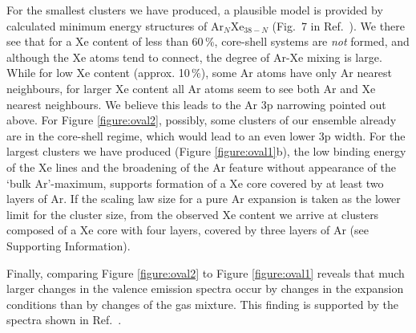 For the smallest clusters we have produced, a plausible model is provided by calculated minimum energy structures of Ar$_N$Xe$_{38-N}$ (Fig.\ 7 in Ref.\ \cite{marques}).
We there see that for a Xe content of less than 60\,\%, core-shell systems are {\it not} formed, and although the Xe atoms tend to connect, the degree of Ar-Xe mixing is large.
While for low Xe content (approx. 10\,\%), some Ar atoms have only Ar nearest neighbours, for larger Xe content all Ar atoms seem to see both Ar and Xe nearest neighbours.
We believe this leads to the Ar 3p narrowing pointed out above.
For Figure \ref{figure:oval2}, possibly, some clusters of our ensemble already are in the core-shell regime, which would lead to an even lower 3p width.
For the largest clusters we have produced (Figure \ref{figure:oval1}b), the low binding energy of the Xe lines and the broadening of the Ar feature without appearance of the `bulk Ar'-maximum, supports formation of a Xe core covered by at least two layers of Ar.
If the scaling law size for a pure Ar expansion is taken as the lower limit for the cluster size, from the observed Xe content we arrive at clusters composed of a Xe core with four layers, covered by three layers of Ar (see Supporting Information).

Finally, comparing Figure \ref{figure:oval2} to Figure \ref{figure:oval1} reveals that much larger changes in the valence emission spectra occur by changes in
the expansion conditions than by changes of the gas mixture.
This finding is supported by the spectra shown in Ref.\ .
%
%
